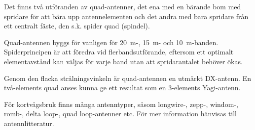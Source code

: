 Det finns två utföranden av quad-antenner, det ena med en bärande bom
med spridare för att bära upp antennelementen och det andra med bara
spridare från ett centralt fäste, den s.k. spider quad (spindel).

Quad-antennen byggs för vanligen för 20~m-, 15~m- och 10~m-banden.
Spiderprincipen är att föredra vid flerbandsutförande, eftersom ett
optimalt elementavstånd kan väljas för varje band utan att spridarantalet
behöver ökas.

Genom den flacka strålningsvinkeln är quad-antennen en utmärkt
DX-antenn. En två-elements quad anses kunna ge ett resultat som en
3-elements Yagi-antenn.

För kortvågsbruk finns många antenntyper, såsom longwire-, zepp-,
windom-, romb-, delta loop-, quad loop-antenner etc. För mer
information hänvisas till antennlitteratur.
